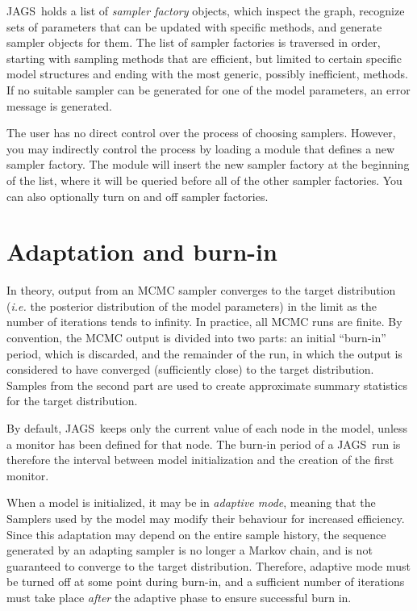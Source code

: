 \documentclass[11pt, a4paper, titlepage]{report}
\newcommand{\JAGS}{\textsf{JAGS}}
\begin{document}
\JAGS\ holds a list of {\em sampler factory} objects, which inspect
the graph, recognize sets of parameters that can be updated with
specific methods, and generate sampler objects for them. The list of
sampler factories is traversed in order, starting with sampling
methods that are efficient, but limited to certain specific model
structures and ending with the most generic, possibly inefficient,
methods. If no suitable sampler can be generated for one of the model
parameters, an error message is generated.

The user has no direct control over the process of choosing
samplers. However, you may indirectly control the process by loading a
module that defines a new sampler factory. The module will insert the
new sampler factory at the beginning of the list, where it will be
queried before all of the other sampler factories. You can also
optionally turn on and off sampler factories. %
 
\section{Adaptation and burn-in}

In theory, output from an MCMC sampler converges to the target
distribution ({\em i.e.} the posterior distribution of the model
parameters) in the limit as the number of iterations tends to
infinity. In practice, all MCMC runs are finite.  By convention, the
MCMC output is divided into two parts: an initial ``burn-in'' period,
which is discarded, and the remainder of the run, in which the output
is considered to have converged (sufficiently close) to the target
distribution. Samples from the second part are used to create
approximate summary statistics for the target distribution.

By default, \JAGS\ keeps only the current value of each node in the
model, unless a monitor has been defined for that node. The burn-in
period of a \JAGS\ run is therefore the interval between model
initialization and the creation of the first monitor.

When a model is initialized, it may be in {\em adaptive mode}, meaning
that the Samplers used by the model may modify their behaviour for
increased efficiency. Since this adaptation may depend on the entire
sample history, the sequence generated by an adapting sampler is no
longer a Markov chain, and is not guaranteed to converge to the target
distribution. Therefore, adaptive mode must be turned off at some
point during burn-in, and a sufficient number of iterations must take
place {\em after} the adaptive phase to ensure successful burn in.
\end{document}
